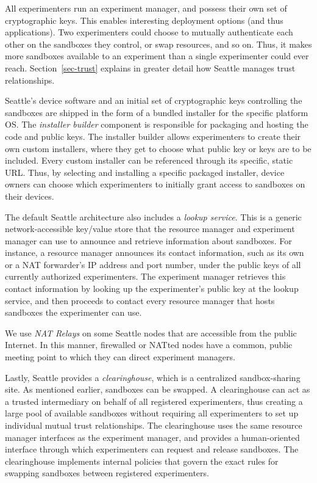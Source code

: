 All experimenters run an experiment manager, and possess
their own set of cryptographic keys. This enables interesting
deployment options (and thus applications).
Two experimenters could choose to mutually authenticate each
other on the sandboxes they control, or swap resources, and
so on. Thus, it makes more sandboxes available to an experiment than
a single experimenter could ever reach. Section~\ref{sec-trust}
explains in greater detail how Seattle manages trust relationships.

Seattle's device software and an initial set of cryptographic
keys controlling the sandboxes are shipped in the form of a bundled
installer for the specific platform \gls{OS}.
The \textit{installer builder} component is responsible for
packaging and hosting the code and public keys.
The installer builder allows experimenters to create their own
custom installers, where they get to choose what public key or keys
are to be included. Every custom installer
can be referenced through its specific, static \gls{URL}.
Thus, by selecting and installing a specific packaged installer,
device owners can choose which experimenters to initially grant
access to sandboxes on their devices.


The default Seattle architecture also includes a
\textit{lookup service}. This is a generic network-accessible
key/value store that the resource manager and experiment manager
can use to announce and retrieve information about sandboxes.
For instance, a resource manager announces its contact information,
such as its own or a \gls{NAT} forwarder's \acrshort{IP} address and port number,
under the public keys of all currently authorized experimenters.
The experiment manager retrieves this contact information by looking up
the experimenter's public key at the lookup service, and then
proceeds to contact every resource manager that hosts sandboxes
the experimenter can use.

We use \textit{\gls{NAT} Relays} on some Seattle nodes that are
accessible from the public Internet. In this manner, firewalled
or \gls{NAT}ted nodes have a common, public meeting point to
which they can direct experiment managers.

Lastly, Seattle provides a \textit{clearinghouse}, which is a
centralized sandbox-sharing site. As mentioned earlier,
sandboxes can be swapped. A clearinghouse can act as a trusted
intermediary on behalf of all registered experimenters, thus creating
a large pool of available sandboxes without requiring all experimenters to
set up individual mutual trust relationships.
The clearinghouse uses the same resource manager interfaces as the
experiment manager, and provides a human-oriented interface through which
experimenters can request and release sandboxes.
The clearinghouse implements internal policies
that govern the exact rules for swapping sandboxes between
registered experimenters.

